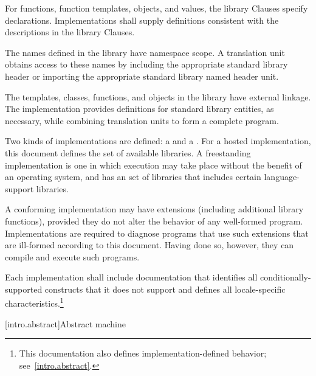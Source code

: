 \pnum
For functions, function templates, objects, and values, the library
Clauses specify declarations. Implementations shall supply definitions
consistent with the descriptions in the library Clauses.

\pnum
The names defined in the library have namespace
scope. A \Cpp{}  translation
unit obtains access to these names by including the
appropriate standard library header or importing
the appropriate standard library named header unit.

\pnum
The templates, classes, functions, and objects in the library have
external linkage. The implementation provides
definitions for standard library entities, as necessary, while combining
translation units to form a complete \Cpp{}  program.%

\pnum
Two kinds of implementations are defined: a  and a
. For a hosted implementation, this
document defines the set of available libraries. A freestanding
implementation is one in which execution may take place without the benefit of
an operating system, and has an  set of libraries that includes certain language-support
libraries.

\pnum
A conforming implementation may have extensions (including
additional library functions), provided they do not alter the
behavior of any well-formed program.
Implementations are required to diagnose programs that use such
extensions that are ill-formed according to this document.
Having done so, however, they can compile and execute such programs.

\pnum
Each implementation shall include documentation that identifies all
conditionally-supported constructs
that it does not support and defines all locale-specific characteristics.\footnote{This documentation also defines implementation-defined behavior;
see~\ref{intro.abstract}.}%
%
%

[intro.abstract]{Abstract machine}

